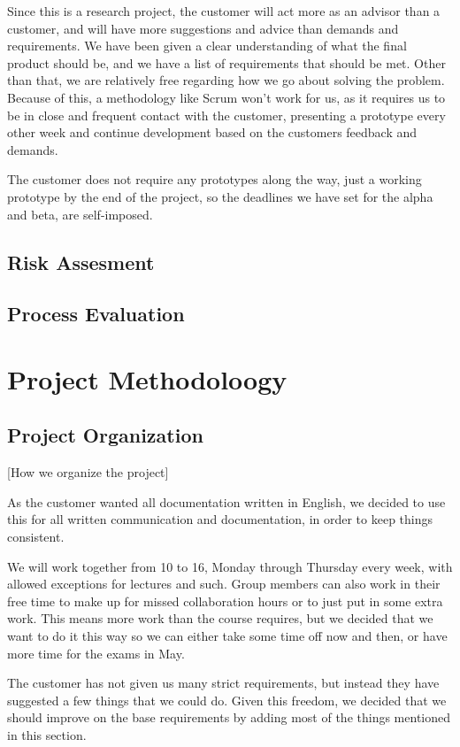 \documentclass[12pt]{article}
\begin{document}
    Since this is a research project, the customer will act more as an advisor than a customer, and will have more suggestions and advice than demands and requirements. We have been given a clear understanding of what the final product should be, and we have a list of requirements that should be met. Other than that, we are relatively free regarding how we go about solving the problem. Because of this, a methodology like Scrum won't work for us, as it requires us to be in close and frequent contact with the customer, presenting a prototype every other week and continue development based on the customers feedback and demands.

    The customer does not require any prototypes along the way, just a working prototype by the end of the project, so the deadlines we have set for the alpha and beta, are self-imposed.
    \subsection{Risk Assesment}\label{risk}
    \subsection{Process Evaluation}\label{processevaluation}
\section{Project Methodoloogy}\label{methodology} 
    \subsection{Project Organization}\label{projectorg} [How we organize the project]

    As the customer wanted all documentation written in English, we decided to use this for all written communication and documentation, in order to keep things consistent.

    We will work together from 10 to 16, Monday through Thursday every week, with allowed exceptions for lectures and such. Group members can also work in their free time to make up for missed collaboration hours or to just put in some extra work. This means more work than the course requires, but we decided that we want to do it this way so we can either take some time off now and then, or have more time for the exams in May.

    The customer has not given us many strict requirements, but instead they have suggested a few things that we could do. Given this freedom, we decided that we should improve on the base requirements by adding most of the things mentioned in this section.
\end{document}
